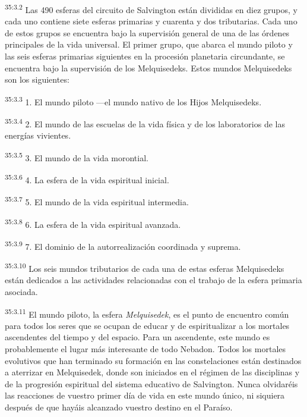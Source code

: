 \par
\textsuperscript{35:3.2} Las 490 esferas del circuito de Salvington están divididas en diez grupos, y cada uno contiene siete esferas primarias y cuarenta y dos tributarias. Cada uno de estos grupos se encuentra bajo la supervisión general de una de las órdenes principales de la vida universal. El primer grupo, que abarca el mundo piloto y las seis esferas primarias siguientes en la procesión planetaria circundante, se encuentra bajo la supervisión de los Melquisedeks. Estos mundos Melquisedeks son los siguientes:

\par
\textsuperscript{35:3.3} 1. El mundo piloto ---el mundo nativo de los Hijos Melquisedeks.

\par
\textsuperscript{35:3.4} 2. El mundo de las escuelas de la vida física y de los laboratorios de las energías vivientes.

\par
\textsuperscript{35:3.5} 3. El mundo de la vida morontial.

\par
\textsuperscript{35:3.6} 4. La esfera de la vida espiritual inicial.

\par
\textsuperscript{35:3.7} 5. El mundo de la vida espiritual intermedia.

\par
\textsuperscript{35:3.8} 6. La esfera de la vida espiritual avanzada.

\par
\textsuperscript{35:3.9} 7. El dominio de la autorrealización coordinada y suprema.

\par
\textsuperscript{35:3.10} Los seis mundos tributarios de cada una de estas esferas Melquisedeks están dedicados a las actividades relacionadas con el trabajo de la esfera primaria asociada.

\par
\textsuperscript{35:3.11} El mundo piloto, la esfera \textit{Melquisedek}, es el punto de encuentro común para todos los seres que se ocupan de educar y de espiritualizar a los mortales ascendentes del tiempo y del espacio. Para un ascendente, este mundo es probablemente el lugar más interesante de todo Nebadon. Todos los mortales evolutivos que han terminado su formación en las constelaciones están destinados a aterrizar en Melquisedek, donde son iniciados en el régimen de las disciplinas y de la progresión espiritual del sistema educativo de Salvington. Nunca olvidaréis las reacciones de vuestro primer día de vida en este mundo único, ni siquiera después de que hayáis alcanzado vuestro destino en el Paraíso.

